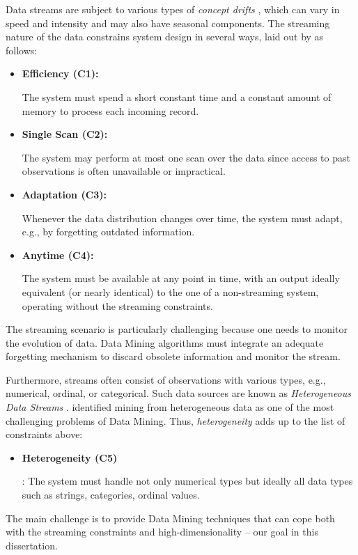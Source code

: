 Data streams are subject to various types of \textit{concept drifts} \cite{DBLP:conf/ictai/BarddalGE15}, which can vary in speed and intensity and may also have seasonal components. 
The streaming nature of the data constrains system design in several ways, laid out by \cite{doi:10.1198/1061860032544} as follows:  
\begin{itemize}[noitemsep]
	\item \hypertarget{C1}{\textbf{Efficiency (C1):}}  The system must spend a short constant time and a constant amount of memory to process each incoming record.
	\item \hypertarget{C2}{\label{C2} \textbf{Single Scan (C2):}} The system may perform at most one scan over the data since access to past observations is often unavailable or impractical. 
	\item \hypertarget{C3}{\textbf{Adaptation (C3):}} Whenever the data distribution changes over time, the system must adapt, e.g., by forgetting outdated information.
	\item \hypertarget{C4}{\label{C4} \textbf{Anytime (C4):}} The system must be available at any point in time, with an output ideally equivalent (or nearly identical) to the one of a non-streaming system, operating without the streaming constraints. 
\end{itemize}   
The streaming scenario is particularly challenging because one needs to monitor the evolution of data. Data Mining algorithms must integrate an adequate forgetting mechanism to discard obsolete information and monitor the stream.


Furthermore, streams often consist of observations with various types, e.g., numerical, ordinal, or categorical. Such data sources are known as \textit{Heterogeneous Data Streams} \cite{DBLP:conf/icdm/YangZ06}. \cite{DBLP:journals/cim/DitzlerRAP15} identified mining from heterogeneous data as one of the most challenging problems of Data Mining. Thus, \textit{heterogeneity} adds up to the list of constraints above:
\begin{itemize}
	\item \hypertarget{C5}{\label{C5} \textbf{Heterogeneity (C5)}}: The system must handle not only numerical types but ideally all data types such as strings, categories, ordinal values. 
\end{itemize} 
The main challenge is to provide Data Mining techniques that can cope both with the streaming constraints and high-dimensionality -- our goal in this dissertation.  

